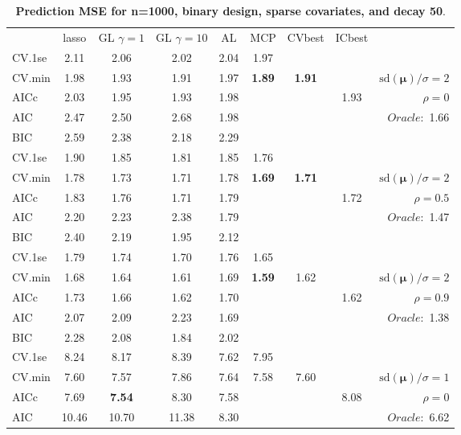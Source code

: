 \clearpage
\begin{table}\vspace{-.5cm}
\caption[l]{ { \bf Prediction MSE for n=1000, binary design, 
sparse covariates, and  decay  50}.}
\vspace{-.5cm}
\footnotesize{}
\begin{center}
\begin{tabular}{l*{7}{c}|r}
 & lasso & GL $\gamma=1$ & GL $\gamma=10$ & AL & MCP  & CVbest & ICbest  \\
\cline{1-9}
CV.1se & 2.11 & 2.06 & 2.02 & 2.04 & 1.97 & & & \\
CV.min & 1.98 & 1.93 & 1.91 & 1.97 & {\bf 1.89} & {\bf 1.91} & & $\mathrm{sd}(\mathbf{\mu})/\sigma=2$ \\
AICc & 2.03 & 1.95 & 1.93 & 1.98 & & & 1.93 &  $\rho=0$ \\
AIC & 2.47 & 2.50 & 2.68 & 1.98 & & & &  \multirow{2}{*}{$Oracle: $ 1.66} \\
BIC & 2.59 & 2.38 & 2.18 & 2.29 & & & &  \\
 \hline 
CV.1se & 1.90 & 1.85 & 1.81 & 1.85 & 1.76 & & & \\
CV.min & 1.78 & 1.73 & 1.71 & 1.78 & {\bf 1.69} & {\bf 1.71} & & $\mathrm{sd}(\mathbf{\mu})/\sigma=2$ \\
AICc & 1.83 & 1.76 & 1.71 & 1.79 & & & 1.72 &  $\rho=0.5$ \\
AIC & 2.20 & 2.23 & 2.38 & 1.79 & & & &  \multirow{2}{*}{$Oracle: $ 1.47} \\
BIC & 2.40 & 2.19 & 1.95 & 2.12 & & & &  \\
 \hline 
CV.1se & 1.79 & 1.74 & 1.70 & 1.76 & 1.65 & & & \\
CV.min & 1.68 & 1.64 & 1.61 & 1.69 & {\bf 1.59} & 1.62 & & $\mathrm{sd}(\mathbf{\mu})/\sigma=2$ \\
AICc & 1.73 & 1.66 & 1.62 & 1.70 & & & 1.62 &  $\rho=0.9$ \\
AIC & 2.07 & 2.09 & 2.23 & 1.69 & & & &  \multirow{2}{*}{$Oracle: $ 1.38} \\
BIC & 2.28 & 2.08 & 1.84 & 2.02 & & & &  \\
 \hline 
CV.1se & 8.24 & 8.17 & 8.39 & 7.62 & 7.95 & & & \\
CV.min & 7.60 & 7.57 & 7.86 & 7.64 & 7.58 & 7.60 & & $\mathrm{sd}(\mathbf{\mu})/\sigma=1$ \\
AICc & 7.69 & {\bf 7.54} & 8.30 & 7.58 & & & 8.08 &  $\rho=0$ \\
AIC & 10.46 & 10.70 & 11.38 & 8.30 & & & &  \multirow{2}{*}{$Oracle: $ 6.62} \\

\end{tabular}
\end{center}
\end{table}
